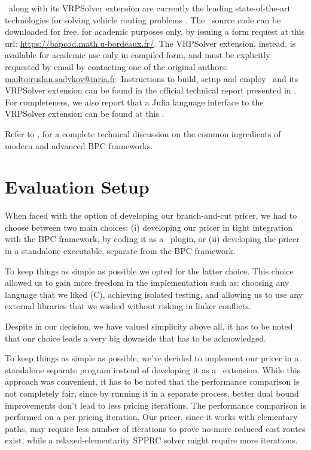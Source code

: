 \medskip

\bapcod\ along with its VRPSolver extension are currently the leading state-of-the-art
technologies for solving vehicle routing problems \parencite{pessoa2020a}.
The \bapcod\ source code can be downloaded for free, for academic purposes only,
by issuing a form request at this url: \url{https://bapcod.math.u-bordeaux.fr/}.
The VRPSolver extension, instead, is available for academic use only in compiled form,
and must be explicitly requested by email by contacting one of the
original authors: \url{mailto:ruslan.sadykov@inria.fr}.
Instructions to build, setup and employ \bapcod\ and its VRPSolver extension
can be found in the official technical report presented in \textcite{sadykov2021}.
For completeness, we also report that
a Julia language interface to the VRPSolver extension
can be found at this
.

Refer to \textcite{sadykov2019b},
for a complete technical discussion on the common ingredients of modern and advanced BPC frameworks.

\section{Evaluation Setup}
\label{sec:results-evaluation-setup}


When faced with the option of developing our branch-and-cut pricer,
we had to choose between two main choices:
(i) developing our pricer in tight integration with the BPC framework,
by coding it as a \bapcod\ plugin,
or (ii) developing the pricer in a standalone executable,
separate from the BPC framework.

To keep things as simple as possible we opted for the latter choice.
This choice allowed us to gain more freedom in the implementation
such as: choosing any language that we liked (C),
achieving isolated testing,
and allowing us to use any external libraries
that we wished without risking in linker conflicts.

Despite in our decision, we have valued simplicity above all,
it has to be noted that our choice leads a very big downside that has to be acknowledged.

To keep things as simple as possible, we've decided to implement our
pricer in a standalone separate program instead of developing it as a \bapcod\ extension.
While this approach was convenient, it has to be noted that the performance comparison is not
completely fair, since by running it in a separate process, better dual bound improvements
don't lead to less pricing iterations.
The performance comparison is performed on a per pricing iteration.
Our pricer, since it works with elementary paths, may require less number of iterations
to prove no-more reduced cost routes exist, while a relaxed-elementarity SPPRC solver
might require more iterations.

